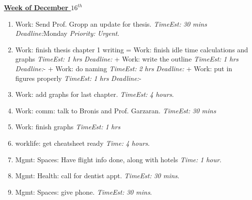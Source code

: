 \documentclass[11pt]{article}
\newcommand{\timeEst}[1]{\textit{Time:} \textit{#1}}
\newcommand{\te}[1]{\textit{TimeEst:} \textit{#1}}
\newcommand{\pr}[1]{\textit{Priority:} \textit{#1}}
\newcommand{\dl}[1]{\textit{Deadline:}#1}
\begin{document}
           {\small \underline{\textbf{Week of December $16^{th}$}} }
           \begin{enumerate} 
           \item \tiny Work: Send Prof. Gropp an update for
             thesis. \te{30 mins} \dl{Monday}  \pr{Urgent}. 
           \item \tiny Work: finish thesis chapter 1 writing =
             Work: finish idle time calculations and graphs \te{1
               hrs} \dl{}  +  Work: write the
             outline \te{1 hrs} \dl{-} + Work: do naming \te{2 hrs}
             \dl{} +  Work: put in figures
             properly \te{1 hrs} \dl{-} 
           \item \tiny Work: add graphs for last chapter. \te{4
               hours}. 
           \item \tiny Work: comm: talk to Bronis and
             Prof. Garzaran. \te{30 mins} 
           \item \tiny Work: finish graphs \te{1 hrs} 
           \item \tiny worklife: get cheatsheet ready \timeEst{4 hours}.
           \item \tiny Mgmt: Spaces: Have flight info done, along
             with hotels \timeEst{1 hour}.
           \item \tiny Mgmt: Health: call for dentist appt. \te{30 mins}. 
           \item \tiny Mgmt: Spaces: give phone. \te{30 mins}. 

           \end{enumerate} 
\end{document}
